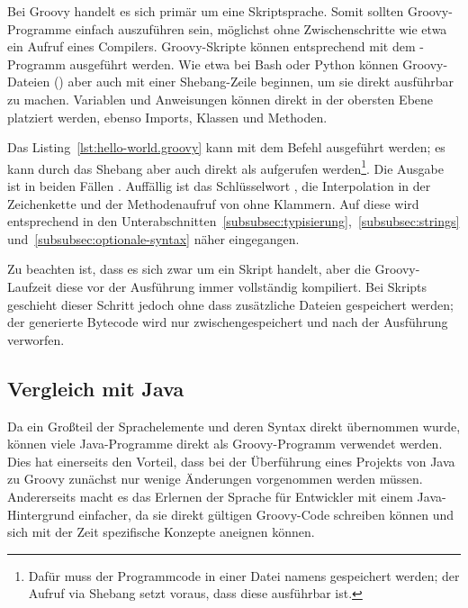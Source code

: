 Bei Groovy handelt es sich primär um eine Skriptsprache.
Somit sollten Groovy-Programme einfach auszuführen sein, möglichst ohne Zwischenschritte wie etwa ein Aufruf eines Compilers.
Groovy-Skripte können entsprechend mit dem -Programm ausgeführt werden.
Wie etwa bei Bash oder Python können Groovy-Dateien () aber auch mit einer Shebang-Zeile beginnen, um sie direkt ausführbar zu machen.
Variablen und Anweisungen können direkt in der obersten Ebene platziert werden, ebenso Imports, Klassen und Methoden.


Das Listing~\ref{lst:hello-world.groovy} kann mit dem Befehl  ausgeführt werden;
es kann durch das Shebang aber auch direkt als  aufgerufen werden\footnote{Dafür muss der Programmcode in einer Datei namens  gespeichert werden;
der Aufruf via Shebang setzt voraus, dass diese ausführbar ist.}.
Die Ausgabe ist in beiden Fällen .
Auffällig ist das Schlüsselwort , die Interpolation in der Zeichenkette und der Methodenaufruf von  ohne Klammern.
Auf diese wird entsprechend in den Unterabschnitten~\ref{subsubsec:typisierung},~\ref{subsubsec:strings} und~\ref{subsubsec:optionale-syntax} näher eingegangen.

Zu beachten ist, dass es sich zwar um ein Skript handelt, aber die Groovy-Laufzeit diese vor der Ausführung immer vollständig kompiliert.
Bei Skripts geschieht dieser Schritt jedoch ohne dass zusätzliche Dateien gespeichert werden;
der generierte Bytecode wird nur zwischengespeichert und nach der Ausführung verworfen.

\subsection{Vergleich mit Java}\label{subsec:vergleichMitJava}

Da ein Großteil der Sprachelemente und deren Syntax direkt übernommen wurde, können viele Java-Programme direkt als Groovy-Programm verwendet werden.
Dies hat einerseits den Vorteil, dass bei der Überführung eines Projekts von Java zu Groovy zunächst nur wenige Änderungen vorgenommen werden müssen.
Andererseits macht es das Erlernen der Sprache für Entwickler mit einem Java-Hintergrund einfacher, da sie direkt gültigen Groovy-Code schreiben können und sich mit der Zeit spezifische Konzepte aneignen können.

